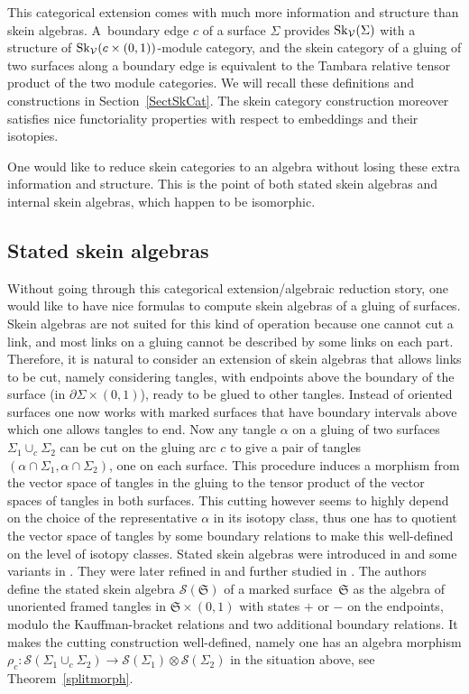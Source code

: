\documentclass[pdftex]{sigma}%
\numberwithin{equation}{section}
\begin{document}
This categorical extension comes with much more information and structure than skein algebras. A~boundary edge $c$ of a surface $\Sigma$ provides ${\rm Sk}_\mathcal{V}(\Sigma)$ with a structure of ${\rm Sk}_\mathcal{V}(c\times(0,1))$-module category, and the skein category of a gluing of two surfaces along a boundary edge is equivalent to the Tambara relative tensor product of the two module categories. We will recall these definitions and constructions in Section~\ref{SectSkCat}. The skein category construction moreover satisfies nice functoriality properties with respect to embeddings and their isotopies.

One would like to reduce skein categories to an algebra without losing these extra information and structure. This is the point of both stated skein algebras and internal skein algebras, which happen to be isomorphic.

\subsection*{Stated skein algebras} Without going through this categorical extension/algebraic reduction story, one would like to have nice formulas to compute skein algebras of a gluing of surfaces. Skein algebras are not suited for this kind of operation because one cannot cut a link, and most links on a gluing cannot be described by some links on each part. Therefore, it is natural to consider an extension of skein algebras that allows links to be cut, namely considering tangles, with endpoints above the boundary of the surface (in $\partial \Sigma \times (0,1)$), ready to be glued to other tangles. Instead of oriented surfaces one now works with marked surfaces that have boundary intervals above which one allows tangles to end. Now any tangle $\alpha$ on a gluing of two surfaces $\Sigma_1 \cup_c \Sigma_2$ can be cut on the gluing arc $c$ to give a pair of tangles $(\alpha \cap \Sigma_1, \alpha \cap \Sigma_2)$, one on each surface. This procedure induces a morphism from the vector space of tangles in the gluing to the tensor product of the vector spaces of tangles in both surfaces. This cutting however seems to highly depend on the choice of the representative $\alpha$ in its isotopy class, thus one has to quotient the vector space of tangles by some boundary relations to make this well-defined on the level of isotopy classes. Stated skein algebras were introduced in \cite{BonahonWong} and some variants in \cite{Muller}. They were later refined in \cite{TTQLe} and further studied in \cite{Cos}. The authors define the stated skein algebra $\mathscr{S}(\mathfrak{S})$ of a marked surface~$\mathfrak{S}$ as the algebra of unoriented framed tangles in $\mathfrak{S} \times (0,1)$ with states $+$ or $-$ on the endpoints, modulo the Kauffman-bracket relations and two additional boundary relations. It makes the cutting construction well-defined, namely one has an algebra morphism $\rho_c\colon \mathscr{S}(\Sigma_1 \cup_c \Sigma_2) \to \mathscr{S}(\Sigma_1) \otimes \mathscr{S}(\Sigma_2)$ in the situation above, see Theorem~\ref{splitmorph}.
\end{document}
